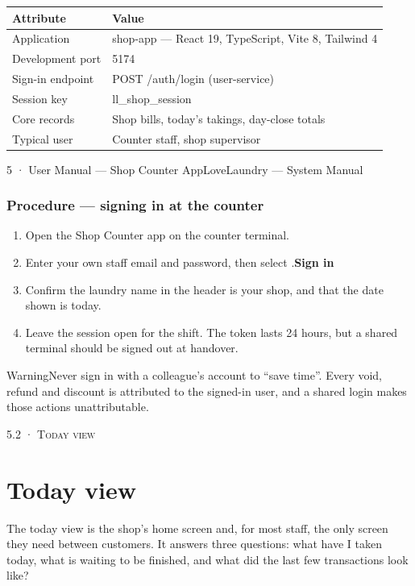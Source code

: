 \documentclass[11pt,a4paper,oneside]{book}
\begin{document}
\begin{center}\small
\begin{tabularx}{\linewidth}{|X|X|}
\hline
\rowcolor{lightgrey}
\textbf{Attribute} & \textbf{Value} \\ \hline
Application & shop-app — React 19, TypeScript, Vite 8, Tailwind 4 \\ \hline
Development port & 5174 \\ \hline
Sign-in endpoint & POST /auth/login (user-service) \\ \hline
Session key & ll\_shop\_session \\ \hline
Core records & Shop bills, today's takings, day-close totals \\ \hline
Typical user & Counter staff, shop supervisor \\ \hline
\end{tabularx}
\end{center}
5 · User Manual — Shop Counter AppLoveLaundry — System Manual

\subsubsection*{Procedure — signing in at the counter}
\begin{enumerate}
\item Open the Shop Counter app on the counter terminal.
\item Enter your own staff email and password, then select .\textbf{Sign in}
\item Confirm the laundry name in the header is your shop, and that the date shown is today.
\item Leave the session open for the shift. The token lasts 24 hours, but a shared terminal should be signed out at handover.
\end{enumerate}
\begin{notebox}WarningNever sign in with a colleague's account to “save time”. Every void, refund and discount is attributed to the signed-in user, and a shared login makes those actions unattributable.\end{notebox}
\textsc{\small\color{crimson}5.2 · Today view}\par\medskip
\section*{Today view}
The today view is the shop's home screen and, for most staff, the only screen they need between customers. It answers three questions: what have I taken today, what is waiting to be finished, and what did the last few transactions look like?
\end{document}
